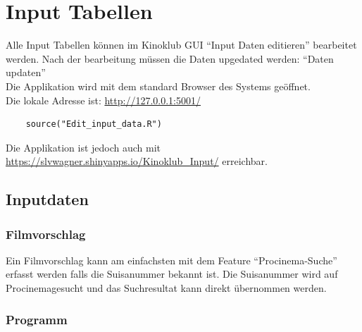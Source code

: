 \documentclass[
]{article}
\begin{document}
\section{Input Tabellen}\label{input-tabellen}

Alle Input Tabellen können im Kinoklub GUI ``Input Daten editieren''
bearbeitet werden. Nach der bearbeitung müssen die Daten upgedated
werden: ``Daten updaten''\\

Die Applikation wird mit dem standard Browser des Systems geöffnet.\\
Die lokale Adresse ist: \url{http://127.0.0.1:5001/}\\

\begin{verbatim}
    source("Edit_input_data.R")
\end{verbatim}

Die Applikation ist jedoch auch mit
\url{https://slvwagner.shinyapps.io/Kinoklub_Input/} erreichbar.

\subsection{Inputdaten}\label{inputdaten}

\subsubsection{Filmvorschlag}\label{filmvorschlag}

Ein Filmvorschlag kann am einfachsten mit dem Feature
``Procinema-Suche'' erfasst werden falls die Suisanummer bekannt ist.
Die Suisanummer wird auf Procinemagesucht und das Suchresultat kann
direkt übernommen werden.

\subsubsection{Programm}\label{programm}
\end{document}

